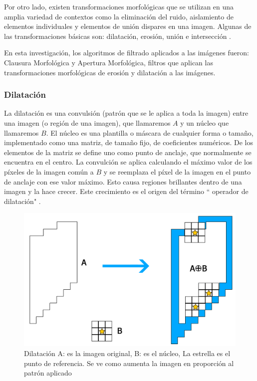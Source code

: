 Por otro lado, existen transformaciones morfológicas que se utilizan en una amplia variedad de contextos como la eliminación del ruido, aislamiento de elementos individuales y elementos de unión dispares en una imagen. Algunas de las transformaciones básicas son: dilatación, erosión, uni\'on e intersecci\'on \cite{BookOpenCv}.

En esta investigación, los algoritmos de filtrado aplicados a las imágenes fueron: Clausura Morfológica y Apertura Morfológica, filtros que aplican las transformaciones morfológicas de erosión y dilatación a las imágenes.

 

\subsubsection{Dilatación}
La dilatación es una convulsión (patr\'on que se le aplica a toda la imagen) entre una imagen (o región de una imagen), que llamaremos $A$ y un núcleo que llamaremos $B$. El n\'ucleo es una plantilla o m\'ascara de cualquier forma o tamaño, implementado como una matriz, de tamaño fijo, de coeficientes numéricos. De los elementos de la matriz se define uno como punto de anclaje, que normalmente se encuentra en el centro. La convulción se aplica calculando el m\'aximo valor de los píxeles de la imagen común a $B$ y se reemplaza el píxel de la imagen en el punto de anclaje con ese valor máximo. Esto causa regiones brillantes dentro de una imagen y la hace crecer. Este crecimiento es el origen del término `` operador de dilatación" \cite{BookOpenCv}. 

\begin{figure}[hbtp]

\centering
\includegraphics[scale=0.2]{imagenes/erosion-model.jpg}
\caption{Dilatación A: es la imagen original, B: es el n\'ucleo, La estrella es el punto de referencia. Se ve como aumenta la imagen en proporci\'on al patr\'on aplicado }
\end{figure}

